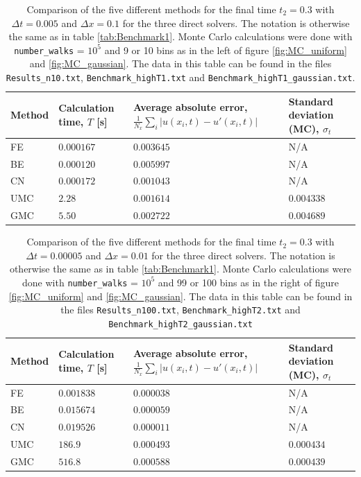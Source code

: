 \documentclass[a4paper, 11pt, notitlepage,english]{article}
\begin{document}
\begin{table}[h!tb]
\begin{center}
\caption{Comparison of the five different methods for the final time $t_2 = 0.3$ with $\Delta t = 0.005$ and $\Delta x=0.1$ for the three direct solvers. The notation is otherwise the same as in table \ref{tab:Benchmark1}. Monte Carlo calculations were done with \texttt{number\_walks} = $10^{5}$ and 9 or 10 bins as in the left of figure \ref{fig:MC_uniform} and \ref{fig:MC_gaussian}. The data in this table can be found in the files \texttt{Results\_n10.txt}, \texttt{Benchmark\_highT1.txt} and \texttt{Benchmark\_highT1\_gaussian.txt}.} 
\begin{tabular}{p{2cm} p{2cm} p{4cm} p{2.5cm}}
\toprule
Method & Calculation time, $T$ [s] & Average absolute error, $\frac{1}{N_x}\sum_i\lvert u(x_i,t) - u'(x_i,t) \rvert$ & Standard deviation (MC), $\sigma_t$ \\ \midrule
FE & $0.000167$ & $0.003645$ & N/A \\
BE & $0.000120$ & $0.005997$ & N/A \\
CN & $0.000172$ & $0.001043$ & N/A \\
UMC & $2.28$ & $0.001614$ & $0.004338$ \\
GMC & $5.50$ & $0.002722$ & $0.004689$ \\
\bottomrule
\end{tabular}
\label{tab:Benchmark3}
\end{center}
\end{table}

\begin{table}[h!tb]
\begin{center}
\caption{Comparison of the five different methods for the final time $t_2 = 0.3$ with $\Delta t = 0.00005$ and $\Delta x=0.01$ for the three direct solvers. The notation is otherwise the same as in table \ref{tab:Benchmark1}. Monte Carlo calculations were done with \texttt{number\_walks} = $10^{5}$ and 99 or 100 bins as in the right of figure \ref{fig:MC_uniform} and \ref{fig:MC_gaussian}. The data in this table can be found in the files \texttt{Results\_n100.txt}, \texttt{Benchmark\_highT2.txt} and \texttt{Benchmark\_highT2\_gaussian.txt}} 
\begin{tabular}{p{2cm} p{2cm} p{4cm} p{2.5cm}}
\toprule
Method & Calculation time, $T$ [s] & Average absolute error, $\frac{1}{N_x}\sum_i\lvert u(x_i,t) - u'(x_i,t) \rvert$ & Standard deviation (MC), $\sigma_t$ \\ \midrule
FE & $0.001838$ & $0.000038$ & N/A \\
BE & $0.015674$ & $0.000059$ & N/A \\
CN & $0.019526$ & $0.000011$ & N/A \\
UMC & $186.9$ & $0.000493$ & $0.000434$ \\
GMC & $516.8$ & $0.000588$ & $0.000439$ \\
\bottomrule
\end{tabular}
\label{tab:Benchmark4}
\end{center}
\end{table}
\end{document}
